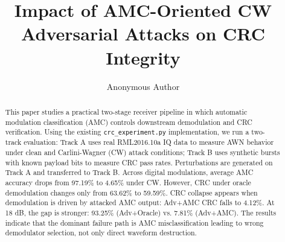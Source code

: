 \documentclass[sigconf]{acmart}
\title{Impact of AMC-Oriented CW Adversarial Attacks on CRC Integrity}
\author{Anonymous Author}
\affiliation{
  \institution{Affiliation Withheld for Review}
  \country{N/A}
}
\begin{document}
\begin{abstract}
This paper studies a practical two-stage receiver pipeline in which automatic modulation
classification (AMC) controls downstream demodulation and CRC verification. Using the existing
\texttt{crc\_experiment.py} implementation, we run a two-track evaluation: Track A uses real
RML2016.10a IQ data to measure AWN behavior under clean and Carlini-Wagner (CW) attack
conditions; Track B uses synthetic bursts with known payload bits to measure CRC pass rates.
Perturbations are generated on Track A and transferred to Track B. Across digital modulations,
average AMC accuracy drops from 97.19\% to 4.65\% under CW. However, CRC under oracle
demodulation changes only from 63.62\% to 59.59\%. CRC collapse appears when demodulation is
driven by attacked AMC output: Adv+AMC CRC falls to 4.12\%. At 18 dB, the gap is stronger:
93.25\% (Adv+Oracle) vs. 7.81\% (Adv+AMC). The results indicate that the dominant failure path
is AMC misclassification leading to wrong demodulator selection, not only direct waveform
destruction.
\end{abstract}


\maketitle




\end{document}
